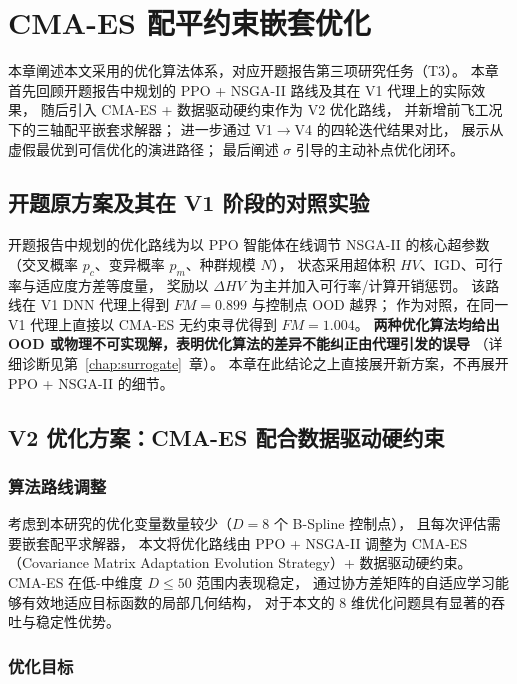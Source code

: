 
\chapter{CMA-ES 配平约束嵌套优化}
\label{chap:optimization}

本章阐述本文采用的优化算法体系，对应开题报告第三项研究任务（T3）。
本章首先回顾开题报告中规划的 PPO + NSGA-II 路线及其在 V1 代理上的实际效果，
随后引入 CMA-ES + 数据驱动硬约束作为 V2 优化路线，
并新增前飞工况下的三轴配平嵌套求解器；
进一步通过 V1$\to$V4 的四轮迭代结果对比，
展示从虚假最优到可信优化的演进路径；
最后阐述 $\sigma$ 引导的主动补点优化闭环。

\section{开题原方案及其在 V1 阶段的对照实验}

开题报告中规划的优化路线为以 PPO 智能体在线调节 NSGA-II 的核心超参数（交叉概率 $p_c$、变异概率 $p_m$、种群规模 $N$），
状态采用超体积 $HV$、IGD、可行率与适应度方差等度量，
奖励以 $\Delta HV$ 为主并加入可行率/计算开销惩罚。
该路线在 V1 DNN 代理上得到 $FM = 0.899$ 与控制点 OOD 越界；
作为对照，在同一 V1 代理上直接以 CMA-ES 无约束寻优得到 $FM = 1.004$。
\textbf{两种优化算法均给出 OOD 或物理不可实现解，表明优化算法的差异不能纠正由代理引发的误导}
（详细诊断见第~\ref{chap:surrogate}~章）。
本章在此结论之上直接展开新方案，不再展开 PPO + NSGA-II 的细节。

\section{V2 优化方案：CMA-ES 配合数据驱动硬约束}

\subsection{算法路线调整}

考虑到本研究的优化变量数量较少（$D = 8$ 个 B-Spline 控制点），
且每次评估需要嵌套配平求解器，
本文将优化路线由 PPO + NSGA-II 调整为 CMA-ES（Covariance Matrix Adaptation Evolution Strategy）+ 数据驱动硬约束。
CMA-ES 在低-中维度 $D \leq 50$ 范围内表现稳定，
通过协方差矩阵的自适应学习能够有效地适应目标函数的局部几何结构，
对于本文的 8 维优化问题具有显著的吞吐与稳定性优势。

\subsection{优化目标}

